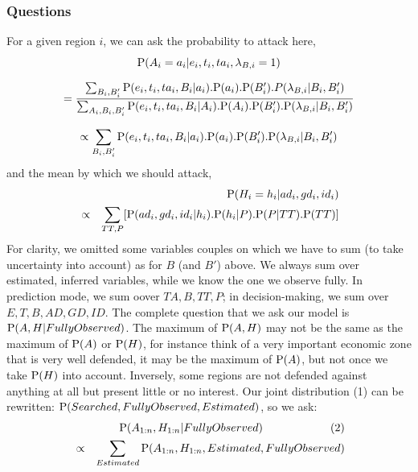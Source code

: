 \subsubsection{Questions}
For a given region $i$, we can ask the probability to attack here,
\begin{equation*}
\mathrm{P}(A_i=a_i|e_i,t_i,ta_i,\lambda_{B,i}=1)
\end{equation*}
\vspace{-0.2cm}
\begin{small}
\begin{equation*}
= \frac{\sum_{B_i,B_i'}\mathrm{P}(e_i,t_i,ta_i,B_i|a_i).\mathrm{P}(a_i).\mathrm{P}(B_i').P(\lambda_{B,i}|B_i,B_i')}{\sum_{A_i,B_i,B_i'}\mathrm{P}(e_i,t_i,ta_i,B_i|A_i).\mathrm{P}(A_i).\mathrm{P}(B_i').\mathrm{P}(\lambda_{B,i}|B_i,B_i')}
\end{equation*}
\end{small}
\vspace{-0.2cm}
\begin{equation*}
\propto \sum_{B_i,B_i'}\mathrm{P}(e_i,t_i,ta_i,B_i|a_i).\mathrm{P}(a_i).\mathrm{P}(B_i').\mathrm{P}(\lambda_{B,i}|B_i,B_i')
\end{equation*}
and the mean by which we should attack,
\begin{eqnarray*}
& & \mathrm{P}(H_i=h_i|ad_i,gd_i,id_i) \\
& \propto & \sum_{TT,P}[\mathrm{P}(ad_i,gd_i,id_i|h_i).\mathrm{P}(h_i|P).\mathrm{P}(P|TT).\mathrm{P}(TT)]
\end{eqnarray*}
For clarity, we omitted some variables couples on which we have to sum (to take uncertainty into account) as for $B$ (and $B'$) above. We always sum over estimated, inferred variables, while we know the one we observe fully. In prediction mode, we sum oover $TA,B,TT,P$; in decision-making, we sum over $E,T,B,AD,GD,ID$. 
The complete question that we ask our model is $\mathrm{P}(A,H|FullyObserved)$. The maximum of $\mathrm{P}(A,H)$ may not be the same as the maximum of $\mathrm{P}(A)$ or $\mathrm{P}(H)$, for instance think of a very important economic zone that is very well defended, it may be the maximum of $\mathrm{P}(A)$, but not once we take $\mathrm{P}(H)$ into account. Inversely, some regions are not defended against anything at all but present little or no interest. Our joint distribution (1) can be rewritten: $\mathrm{P}(Searched,FullyObserved,Estimated)$, so we ask:
\begin{eqnarray*}
& & \PP(A_{1:n},H_{1:n}|FullyObserved) \ \ \ \ \ \ \ \ \ \ \ \ \ \ \ \ \ \  \mathrm(2) \\
& \propto & \sum_{Estimated}\PP(A_{1:n},H_{1:n},Estimated,FullyObserved)
\end{eqnarray*}


